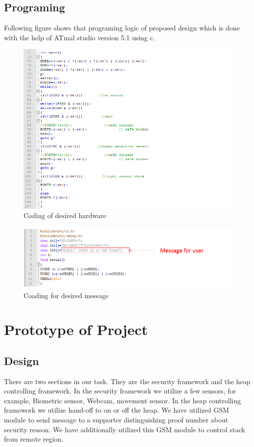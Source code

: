 \documentclass[twoside,a4paper,16pt]{book}
\begin{document}
{{			\section{Programing}
			Following figure shows that programing logic of proposed design which is done with the help of ATmal studio version 5.1 using c.
			\newpage
			\begin{figure}[ht!]
				\begin{left}
					\includegraphics[width=15.0cm]{p5.png}
					\caption{Coding of desired hardware }
				\end{left}
			\end{figure}
			\begin{figure}[ht!]
				\begin{left}
					\includegraphics[width=15.0cm]{p7.png}
					\caption{Coading for desired message }
				\end{left}
			\end{figure}
			\chapter{Prototype of Project}
			\section{Design}
			There are two sections in our task. They are the security framework and the heap controlling framework. In the security framework we utilize a few sensors, for example, Biometric sensor, Webcam, movement sensor. In the heap controlling framework we utilize hand-off to on or off the heap. We have utilized GSM module to send message to a supporter distinguishing proof number about security reason. We have additionally utilized this GSM module to control stack from remote region.
}}
\end{document}
